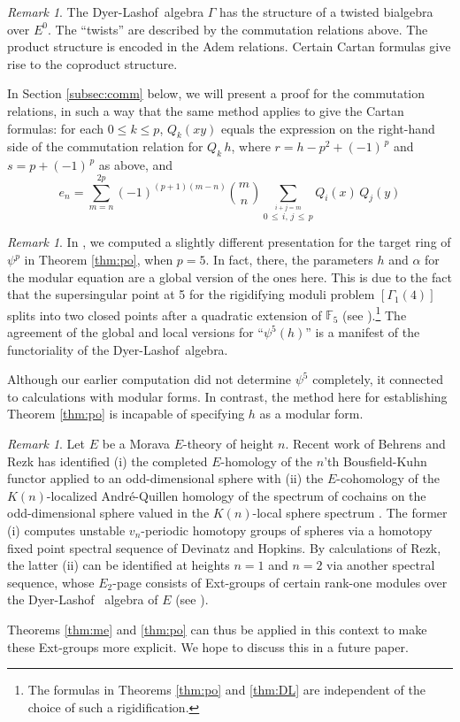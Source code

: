 \documentclass{gtpart}
\theoremstyle{definition}
\theoremstyle{remark}
\newtheorem{rmk}[equation]{Remark}
\newcommand{\mb}[1]{\mathbb{#1}}
\newcommand{\DL}{Dyer-Lashof~}
\newcommand{\BF}{{\mb F}}
\newcommand{\A}{\alpha}
\newcommand{\G}{\Gamma}
\renewcommand{\=}{\approx}
\renewcommand{\-}{\sim}
\newcommand{\ch}[2]{{#1 \choose #2}}
\numberwithin{equation}{section}
\begin{document}
\begin{rmk}
 The \DL algebra $\G$ has the structure of a twisted bialgebra over $E^0$.  The 
 ``twists'' are described by the commutation relations above.  The product 
 structure is encoded in the Adem relations.  Certain Cartan formulas give rise 
 to the coproduct structure.  

 In Section \ref{subsec:comm} below, we will present a proof for the commutation 
 relations, in such a way that the same method applies to give the Cartan 
 formulas: for each $0 \leq k \leq p$, $Q_k(x y)$ equals the expression on the 
 right-hand side of the commutation relation for $Q_k \, h$, where 
 $r = h - p^2 + (-1)^{\,p}$ and $s = p + (-1)^{\,p}$ as above, and 
 \[
  e_n = \sum_{m = n}^{2 p} (-1)^{(p + 1) (m - n)} \ch{m}{n} 
  \sum_{\stackrel{\scriptstyle i + j = m}{0 \,\leq\, i, \, j \,\leq\, p}} 
  Q_i(x) \, Q_j(y) 
 \]
\end{rmk}

\begin{rmk}
 In \cite[Example 3.5]{ho}, we computed a slightly different presentation for 
 the target ring of $\psi^p$ in Theorem \ref{thm:po}, when $p = 5$.  In fact, 
 there, the parameters $h$ and $\A$ for the modular equation are a global 
 version of the ones here.  This is due to the fact that the supersingular point 
 at 5 for the rigidifying moduli problem $[\G_1(4)]$ splits into two closed 
 points after a quadratic extension of $\BF_5$ (see 
 \cite[Example 2.6]{ho}).\footnote{The formulas in Theorems \ref{thm:po} and 
 \ref{thm:DL} are independent of the choice of such a rigidification.  }  The 
 agreement of the global and local versions for ``$\psi^5(h)$'' is a manifest of 
 the functoriality of the \DL algebra.  

 Although our earlier computation did not determine $\psi^5$ completely, it 
 connected to calculations with modular forms.  In contrast, the method here for 
 establishing Theorem \ref{thm:po} is incapable of specifying $h$ as a modular 
 form.  
\end{rmk}

\begin{rmk}
 Let $E$ be a Morava $E$-theory of height $n$.  Recent work of Behrens and Rezk 
 has identified (i) the completed $E$-homology of the $n$'th Bousfield-Kuhn 
 functor applied to an odd-dimensional sphere with (ii) the $E$-cohomology of 
 the $K(n)$-localized Andr\'e-Quillen homology of the spectrum of cochains on 
 the odd-dimensional sphere valued in the $K(n)$-local sphere spectrum 
 \cite[Theorem 8.1]{BKTAQ}.  The former (i) computes unstable $v_n$-periodic 
 homotopy groups of spheres via a homotopy fixed point spectral sequence of 
 Devinatz and Hopkins.  By calculations of Rezk, the latter (ii) can be 
 identified at heights $n = 1$ and $n = 2$ via another spectral sequence, whose 
 $E_2$-page consists of Ext-groups of certain rank-one modules over the \DL 
 algebra of $E$ (see \cite[Example 2.13]{h2}).  

 Theorems \ref{thm:me} and \ref{thm:po} can thus be applied in this context to 
 make these Ext-groups more explicit.  We hope to discuss this in a future 
 paper.  
\end{rmk}
\end{document}
